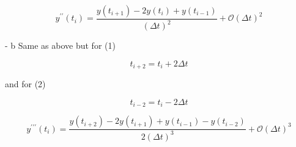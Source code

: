 $$
y^{\prime \prime}\left(t_{i}\right)=\frac{y\left(t_{i+1}\right)-2 y\left(t_{i}\right)+y\left(t_{i-1}\right)}{(\Delta t)^{2}}+\mathcal{O}(\Delta t)^{2}
$$




- b\) 
Same as above but for (1)

$$
t_{i+2}=t_{i}+2 \Delta t
$$

and for (2)

$$
t_{i-2}=t_{i}-2 \Delta t
$$

$$
y^{\prime \prime \prime}\left(t_{i}\right)=\frac{y\left(t_{i+2}\right)-2y\left(t_{i+1}\right) + y\left(t_{i-1}\right) - y\left(t_{i-2}\right)}{2(\Delta t)^{3}}+\mathcal{O}(\Delta t)^{3}
$$



